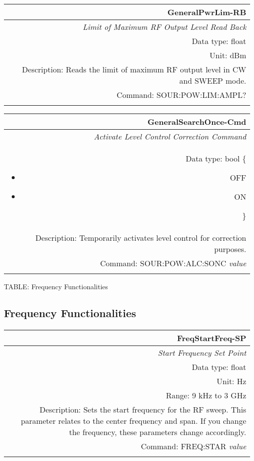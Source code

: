 \documentclass[openany]{article}
\begin{document}
		\begin{tabular}{N}
			\hline
			\bfseries GeneralPwrLim-RB \\ \hline
			\emph{Limit of Maximum RF Output Level Read Back} \\
			Data type: float \\
			Unit: dBm \\
			Description: Reads the limit of maximum RF output level in CW and SWEEP mode. \\
			Command: SOUR:POW:LIM:AMPL? \\
			\\

		\end{tabular}


		\begin{tabular}{N}
			\hline
			\bfseries GeneralSearchOnce-Cmd \\ \hline
			\emph{Activate Level Control Correction Command} \\
			Data type: bool \{\begin{itemize}[noitemsep]
				\small
				\item[] OFF
				\item[] ON
			\end{itemize}\} \\
			Description: Temporarily activates level control for correction purposes. \\
			Command: SOUR:POW:ALC:SONC \emph{value} \\
			\\

		\end{tabular}


	 TABLE: Frequency Functionalities
	\subsection{Frequency Functionalities}\label{pvgroup:function} %

	\paragraph{}

		\begin{tabular}{N}
			\hline
			\bfseries FreqStartFreq-SP \\ \hline
			\emph{Start Frequency Set Point} \\
			Data type: float \\
			Unit: Hz \\
			Range: 9 kHz to 3 GHz \\
			Description: Sets the start frequency for the RF sweep. This parameter relates to the center frequency and span. If you change the frequency, these parameters change accordingly. \\
			Command: FREQ:STAR \emph{value} \\
			\\
			
		\end{tabular}
\end{document}
